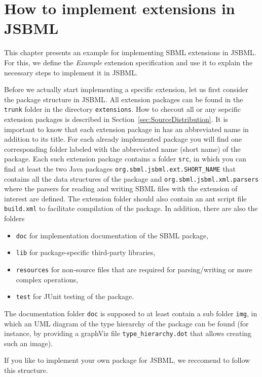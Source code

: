 \chapter{How to implement extensions in JSBML}
\label{sec:howToExtension}

This chapter presents an example for implementing SBML extensions in JSBML.
For this, we define the \emph{Example} extension specification and use it to
explain the necessary steps to implement it in JSBML.

Before we actually start implementing a specific extension, let us first
consider the package structure in JSBML. All extension packages can be found in
the \texttt{trunk} folder in the directory \texttt{extensions}. How to checout
all or any sepcific extension packages is described in
Section~\vref{sec:SourceDistribution}. It is important to know that each
extension package in \SBML{} has an abbreviated name in addition to its title.
For each already implemented package you will find one corresponding folder
labeled with the abbreviated name (short name) of the package. Each such
extension package contains a folder \texttt{src}, in which you can find at
least the two Java packages \texttt{org.sbml.jsbml.ext.SHORT\_NAME} that
contains all the data structures of the package and \texttt{org.sbml.jsbml.xml.parsers}
where the parsers for reading and writing SBML files with the extension of
interest are defined. The extension folder should also contain an ant script
file \texttt{build.xml} to facilitate compilation of the package.
In addition, there are also the folders
\begin{itemize}
  \item \texttt{doc} for implementation documentation of the SBML package,
  \item \texttt{lib} for package-specific third-party libraries,
  \item \texttt{resources} for non-source files that are required for
  parsing/writing or more complex operations,
  \item \texttt{test} for JUnit testing of the package.
\end{itemize}
The documentation folder \texttt{doc} is supposed to at least contain a sub
folder \texttt{img}, in which an UML diagram of the type hierarchy of the
package can be found (for instance, by providing a
graphViz file \texttt{type\_hierarchy.dot} that allows creating such an image).

If you like to implement your own package for JSBML, we reccomend to follow this
structure.

